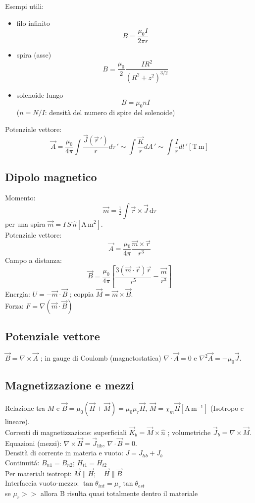 \documentclass{book}
\begin{document}
Esempi utili: 
\begin{itemize} 
\item filo infinito 
\[
B=\frac{\mu_0 I}{2\pi r}
\]
\item spira (asse) 
\[
B=\frac{\mu_0}{2}\frac{I R^2}{(R^2+z^2)^{3/2}}
\]  
\item solenoide lungo 
\[
B=\mu_0 n I
\]
($n= N/I$: densità del numero di spire del solenoide)
\end{itemize}
Potenziale vettore: $$    \vec{A}= \frac{\mu_0}{4 \pi} \int \frac{\vec{J}(\vec{r}\,')}{r} d\tau\,' \sim \int \frac{\vec{K}}{r}dA\,' \sim \int \frac{I}{r}dl\,' \left[ \mathrm{T\,m} \right]$$
\subsection*{Dipolo magnetico}
Momento: 
\[
\vec{m}=\tfrac{1}{2}\int \vec{r}\times\vec{J}\,\mathrm{d}\tau
\] 
per una  spira $\vec{m}=I\,S\,\hat{n} \left[ \mathrm{A\,m^{2}} \right]$.\\
Potenziale vettore: 
\[
\vec{A}=\dfrac{\mu_0}{4\pi}\dfrac{\vec{m}\times\vec{r}}{r^3}
\]
Campo a distanza: 
\[ 
\vec{B}=\dfrac{\mu_0}{4\pi}\left[\dfrac{3(\vec{m}\cdot\vec{r})\vec{r}}{r^5}-\dfrac{\vec{m}}{r^3}\right]
\]
Energia: $U=-\vec{m}\cdot\vec{B}$ ; coppia $\vec{M}=\vec{m}\times\vec{B}$.\\
Forza: $F=\nabla(\vec{m}\cdot \vec{B})$

\subsection*{Potenziale vettore}
$\vec{B}=\nabla\times\vec{A}$ ; in gauge di Coulomb (magnetostatica) $\nabla\cdot\vec{A}=0$ e $\nabla^2\vec{A}=-\mu_0\vec{J}$.

\subsection*{Magnetizzazione e mezzi}
Relazione tra $M$ e 
$\vec{B}=\mu_0(\vec{H}+\vec{M})=\mu_0\mu_r\vec{H}$, \; $\vec{M}=\chi_m\vec{H}\left[ \mathrm{A\,m^{-1}} \right]$ (Isotropo e lineare).\\
Correnti di magnetizzazione: superficiali $\vec{K}_b=\vec{M}\times\hat{n}$ ; volumetriche $\vec{J}_b=\nabla\times\vec{M}$.\\
Equazioni (mezzi): $\nabla\times\vec{H}=\vec{J}_{\mathrm{lib}}$, \; $\nabla\cdot\vec{B}=0$.\\
Densità di corrente in materia e vuoto: 
$J=J_{lib}+J_{b}$\\
Continuit\'a: $B_{n1}= B_{n2}$; $H_{t1}=H_{t2}$\\
Per materiali isotropi:
$\vec{M} \parallel \vec{H}; \quad \vec{H} \parallel \vec{B}$\\
Interfaccia vuoto-mezzo: $\tan \theta_{int} = \mu_{r} \tan \theta_{est}$ \\
se $\mu_r>>$ allora B risulta quasi totalmente dentro il materiale  
\end{document}
